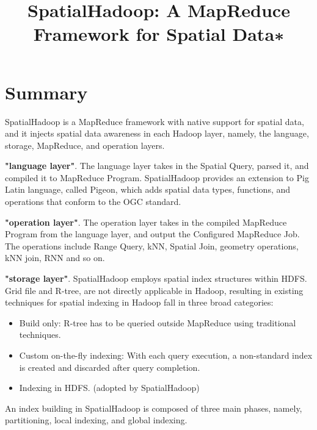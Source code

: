 \documentclass[conference]{IEEEtran}
\begin{document}
	
	\title{SpatialHadoop: A MapReduce Framework
		for Spatial Data∗}	
	\maketitle
	\IEEEpeerreviewmaketitle	
	\section{Summary}
	SpatialHadoop is a MapReduce framework with native support for spatial data, and it injects spatial data awareness in each Hadoop layer, namely, the language, storage, MapReduce, and operation layers.
	
	\textbf{"language layer"}. The language layer takes in the Spatial Query, parsed it, and compiled it to MapReduce Program. SpatialHadoop provides an extension to Pig Latin language, called Pigeon, which adds spatial data types, functions, and operations that conform to the OGC standard.
	
    \textbf{"operation layer"}. The operation layer takes in the compiled MapReduce Program from the language layer, and output the Configured MapReduce Job. The operations include Range Query, kNN, Spatial Join, geometry operations, kNN join, RNN and so on.
    
	\textbf{"storage layer"}. SpatialHadoop employs spatial index structures within HDFS. Grid file and R-tree, are not directly applicable in Hadoop, resulting in existing techniques for spatial indexing in Hadoop fall in three broad categories:
	
	\begin{itemize}
		\item Build only: R-tree has to be queried outside MapReduce using traditional techniques.
		\item Custom on-the-fly indexing: With each query execution, a non-standard index is created and discarded after query completion.
		\item Indexing in HDFS. (adopted by SpatialHadoop)
	\end{itemize}
	
	An index building in SpatialHadoop is composed of three main phases, namely, partitioning, local indexing, and global indexing.
	
\end{document}
